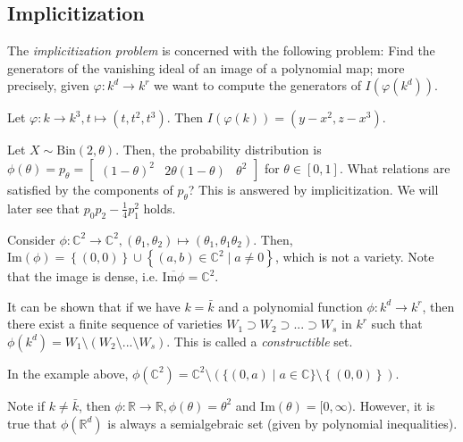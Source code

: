 \subsection{Implicitization}

The \emph{implicitization problem} is concerned with the following problem: Find the generators of the vanishing ideal of an image of a polynomial map; more precisely, given \( \varphi: k^d \to k^r \) we want to compute the generators of \( I(\varphi(k^d)) \).

\begin{eg}
  Let \( \varphi: k \to k^3, t \mapsto (t,t^2,t^3)  \). Then \( I(\varphi(k)) = (y - x^2, z - x^3) \).
\end{eg}

\begin{eg}
  Let \( X \sim \mathrm{Bin}(2, \theta) \). Then, the probability distribution is \( \phi(\theta) = p_\theta = \begin{bmatrix}(1 - \theta)^2 & 2 \theta(1 - \theta) & \theta^2 \end{bmatrix} \) for \( \theta \in [0,1] \). What relations are satisfied by the components of \( p_\theta \)? This is answered by implicitization. We will later see that \( p_0p_2 - \frac{1}{4}p_1^2 \) holds.
\end{eg}

\begin{eg}
Consider \( \phi: \mathbb{C}^2 \to \mathbb{C}^2, (\theta_1, \theta_2) \mapsto (\theta_1, \theta_1\theta_2) \). Then, \( \mathrm{Im}(\phi) = \left\{ (0,0) \right\} \cup \left\{ (a,b) \in \mathbb{C}^2 \mid a \neq 0 \right\}\), which is not a variety. Note that the image is dense, i.e. \( \overline{\mathrm{Im}\phi} = \mathbb{C}^2 \). 
\end{eg}

\begin{remark}
  It can be shown that if we have \( k = \bar k \) and a polynomial function \( \phi: k^d \to k^r \), then there exist a finite sequence of varieties \( W_1 \supset W_2 \supset ... \supset W_s \) in \( k^r \) such that \( \phi({k^d}) = W_1 \setminus(W_2 \setminus ... \setminus W_s) \). This is called a \emph{constructible} set. 

  In the example above, \( \phi(\mathbb{C}^2) = \mathbb{C}^2 \setminus (\{ (0,a) \mid a \in \mathbb{C} \} \setminus \left\{ (0,0) \right\}) \).

  Note if \( k \neq \bar k \), then \( \phi: \mathbb{R} \to \mathbb{R}, \phi(\theta) = \theta^2 \) and \( \mathrm{Im}(\theta) = [0, \infty) \). However, it is true that \( \phi(\mathbb{R}^d) \) is always a semialgebraic set (given by polynomial inequalities).

\end{remark}


